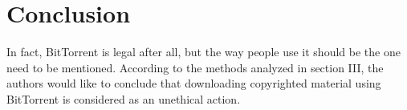 \documentclass[conference]{IEEEtran}
\begin{document}
\section{Conclusion} \label{conclusion}
In fact, BitTorrent is legal after all, but the way people use it should be the one need to be mentioned. According to the methods analyzed in section III, the authors would like to conclude that downloading copyrighted material using BitTorrent is considered as an unethical action. 














%
%
%







\end{document}
